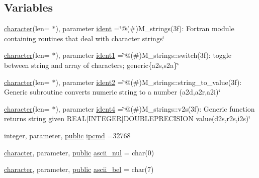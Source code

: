 \subsection*{Variables}
\begin{DoxyCompactItemize}
\item 
\hyperlink{option__stopwatch_83_8txt_abd4b21fbbd175834027b5224bfe97e66}{character}(len= $\ast$), parameter \hyperlink{namespacem__strings_a1a9ef3b9018fa526c23873b95f53768f}{ident} =\char`\"{}@(\#)M\+\_\+strings(3f)\+: Fortran module containing routines that deal with character strings\char`\"{}
\item 
\hyperlink{option__stopwatch_83_8txt_abd4b21fbbd175834027b5224bfe97e66}{character}(len= $\ast$), parameter \hyperlink{namespacem__strings_a13ee1b22ec4a8cb9c2137864495421d3}{ident1} =\char`\"{}@(\#)M\+\_\+strings\+::switch(3f)\+: toggle between string and array of characters; generic\{a2s,s2a\}\char`\"{}
\item 
\hyperlink{option__stopwatch_83_8txt_abd4b21fbbd175834027b5224bfe97e66}{character}(len= $\ast$), parameter \hyperlink{namespacem__strings_ab6570916910af932896de93e4792cf46}{ident2} =\char`\"{}@(\#)M\+\_\+strings\+::string\+\_\+to\+\_\+value(3f)\+: Generic subroutine converts numeric string to a number (a2d,a2r,a2i)\char`\"{}
\item 
\hyperlink{option__stopwatch_83_8txt_abd4b21fbbd175834027b5224bfe97e66}{character}(len= $\ast$), parameter \hyperlink{namespacem__strings_a19b07bcbc88c40854caf542d11f72cd0}{ident4} =\char`\"{}@(\#)M\+\_\+strings\+::v2s(3f)\+: Generic function returns string given R\+E\+A\+L$\vert$\+I\+N\+T\+E\+G\+E\+R$\vert$\+D\+O\+U\+B\+L\+E\+P\+R\+E\+C\+I\+S\+I\+O\+N value(d2s,r2s,i2s)\char`\"{}
\item 
integer, parameter, \hyperlink{M__stopwatch_83_8txt_a2f74811300c361e53b430611a7d1769f}{public} \hyperlink{namespacem__strings_a40ffeae8c41d579efd77648ffc3d9a19}{ipcmd} =32768
\item 
\hyperlink{option__stopwatch_83_8txt_abd4b21fbbd175834027b5224bfe97e66}{character}, parameter, \hyperlink{M__stopwatch_83_8txt_a2f74811300c361e53b430611a7d1769f}{public} \hyperlink{namespacem__strings_a9de5098e31c6411a43323b1d7f19a886}{ascii\+\_\+nul} = char(0)
\item 
\hyperlink{option__stopwatch_83_8txt_abd4b21fbbd175834027b5224bfe97e66}{character}, parameter, \hyperlink{M__stopwatch_83_8txt_a2f74811300c361e53b430611a7d1769f}{public} \hyperlink{namespacem__strings_ae939ea755cfa377c5ed5f09ba8b0e923}{ascii\+\_\+bel} = char(7)
\item 

\end{DoxyCompactItemize}
